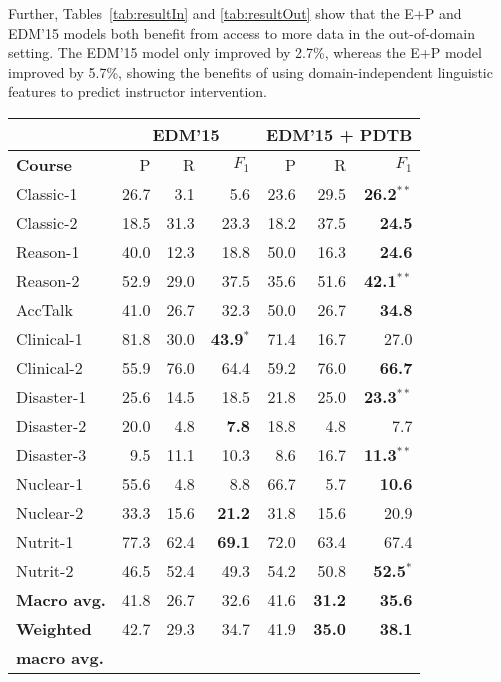\documentclass[letterpaper]{article}
\begin{document}
Further, Tables~\ref{tab:resultIn} and \ref{tab:resultOut} show that 
the E+P and EDM'15 models both benefit from access to more data in 
the out-of-domain setting. The EDM'15 model only improved by 2.7\%, 
whereas the E+P model improved by 5.7\%, showing the benefits 
of using domain-independent linguistic features to predict instructor 
intervention.
\begin{table}
\centering
\def\arraystretch{1.15}%
\small
\begin{tabular}{|l|r|r|r||r|r|r|}
\hline 
&
\multicolumn{3}{c||}{EDM'15} & 
\multicolumn{3}{c|}{EDM'15 + PDTB}
\\
\hline
\bf Course&  P&  R& $F_1$& P&  R& $F_1$\\
\hline
{\sc Classic-1} & 26.7& 3.1& 5.6& 23.6& 29.5& \textbf{26.2}$^{**}$\\
\hline
{\sc Classic-2} & 18.5& 31.3& 23.3& 18.2& 37.5& \textbf{24.5}\\
\hline
{\sc Reason-1} & 40.0& 12.3& 18.8& 50.0& 16.3& \textbf{24.6}\\
\hline
{\sc Reason-2} & 52.9& 29.0& 37.5& 35.6& 51.6& \textbf{42.1}$^{**}$\\
\hline
\hline
{\sc AccTalk} & 41.0& 26.7& 32.3& 50.0& 26.7& \textbf{34.8}\\
\hline
{\sc Clinical-1} & 81.8& 30.0& \textbf{43.9}$^*$& 71.4& 16.7& 27.0\\
\hline
{\sc Clinical-2} & 55.9& 76.0& 64.4& 59.2& 76.0& \textbf{66.7}\\
\hline
{\sc Disaster-1} & 25.6& 14.5& 18.5& 21.8& 25.0& \textbf{23.3}$^{**}$\\
\hline
{\sc Disaster-2} & 20.0& 4.8& \textbf{7.8}& 18.8& 4.8& 7.7 \\
\hline
{\sc Disaster-3} & 9.5& 11.1& 10.3& 8.6& 16.7& \textbf{11.3}$^{**}$\\
\hline
{\sc Nuclear-1} & 55.6& 4.8& 8.8& 66.7& 5.7& \textbf{10.6}\\
\hline
{\sc Nuclear-2} & 33.3& 15.6& \textbf{21.2}& 31.8& 15.6& 20.9\\
\hline
{\sc Nutrit-1} & 77.3& 62.4& \textbf{69.1}& 72.0& 63.4& 67.4\\
\hline
{\sc Nutrit-2} & 46.5& 52.4& 49.3& 54.2& 50.8& \textbf{52.5}$^*$\\
\hline
\hline
\textbf{Macro avg.}& 41.8& 26.7& 32.6& 41.6& \textbf{31.2}& \textbf{35.6}\\
\hline
\textbf{Weighted} & 42.7& 29.3& 34.7& 41.9& \textbf{35.0}& \textbf{38.1}\\
\textbf{macro avg.}& & & & & &\\

\end{tabular}
\end{table}
\end{document}
